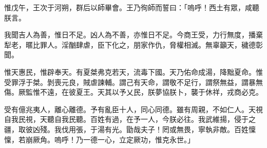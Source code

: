 
\begin{pinyinscope}
惟戊午，王次于河朔，群后以師畢會。王乃徇師而誓曰：「嗚呼！西土有眾，咸聽朕言。

我聞吉人為善，惟日不足。凶人為不善，亦惟日不足。今商王受，力行無度，播棄犁老，暱比罪人。淫酗肆虐，臣下化之，朋家作仇，脅權相滅。無辜籲天，穢德彰聞。

惟天惠民，惟辟奉天。有夏桀弗克若天，流毒下國。天乃佑命成湯，降黜夏命。惟受罪浮于桀。剝喪元良，賊虐諫輔。謂己有天命，謂敬不足行，謂祭無益，謂暴無傷。厥監惟不遠，在彼夏王。天其以予乂民，朕夢協朕卜，襲于休祥，戎商必克。

受有億兆夷人，離心離德。予有亂臣十人，同心同德。雖有周親，不如仁人。天視自我民視，天聽自我民聽。百姓有過，在予一人，今朕必往。我武維揚，侵于之疆，取彼凶殘。我伐用張，于湯有光。勖哉夫子！罔或無畏，寧執非敵。百姓懍懍，若崩厥角。嗚呼！乃一德一心，立定厥功，惟克永世。」


\end{pinyinscope}